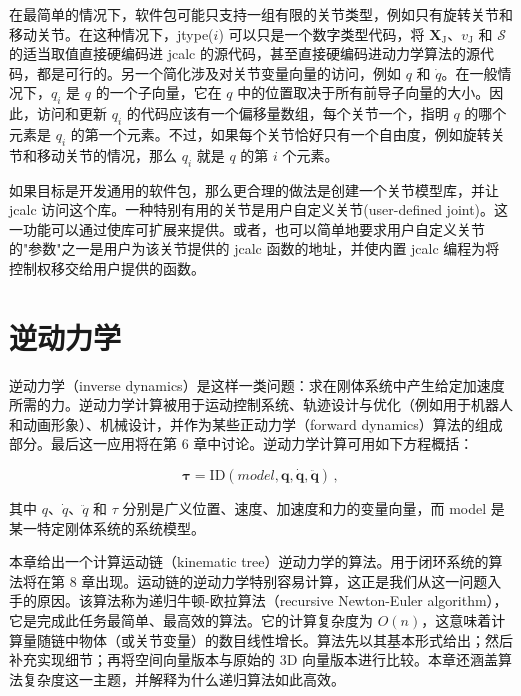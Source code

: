 \documentclass[10pt,a4paper]{book}
\theoremstyle{thmstyle} %
\theoremstyle{defstyle} %
\theoremstyle{prostyle} %
\begin{document}
在最简单的情况下，软件包可能只支持一组有限的关节类型，例如只有旋转关节和移动关节。在这种情况下，jtype($i$) 可以只是一个数字类型代码，将 $\mathbf{X}_{\mathrm{J}}$、$v_{\mathrm{J}}$ 和 $\mathcal{S}$ 的适当取值直接硬编码进 jcalc 的源代码，甚至直接硬编码进动力学算法的源代码，都是可行的。另一个简化涉及对关节变量向量的访问，例如 $q$ 和 $\dot{q}$。在一般情况下，$q_{i}$ 是 $q$ 的一个子向量，它在 $q$ 中的位置取决于所有前导子向量的大小。因此，访问和更新 $q_{i}$ 的代码应该有一个偏移量数组，每个关节一个，指明 $q$ 的哪个元素是 $q_{i}$ 的第一个元素。不过，如果每个关节恰好只有一个自由度，例如旋转关节和移动关节的情况，那么 $q_{i}$ 就是 $q$ 的第 $i$ 个元素。



如果目标是开发通用的软件包，那么更合理的做法是创建一个关节模型库，并让 jcalc 访问这个库。一种特别有用的关节是用户自定义关节(user-defined joint)。这一功能可以通过使库可扩展来提供。或者，也可以简单地要求用户自定义关节的"参数"之一是用户为该关节提供的 jcalc 函数的地址，并使内置 jcalc 编程为将控制权移交给用户提供的函数。





\chapter{逆动力学}







逆动力学（inverse dynamics）是这样一类问题：求在刚体系统中产生给定加速度所需的力。逆动力学计算被用于运动控制系统、轨迹设计与优化（例如用于机器人和动画形象）、机械设计，并作为某些正动力学（forward dynamics）算法的组成部分。最后这一应用将在第 6 章中讨论。逆动力学计算可用如下方程概括：



$$
\boldsymbol{ \tau } = \mathrm { I D } ( m o d e l , \boldsymbol{ q } , \dot { \boldsymbol{ q } } , \ddot { \boldsymbol{ q } } ) \, ,
$$



其中 $q$、$\dot{q}$、$\ddot{q}$ 和 $\tau$ 分别是广义位置、速度、加速度和力的变量向量，而 model 是某一特定刚体系统的系统模型。



本章给出一个计算运动链（kinematic tree）逆动力学的算法。用于闭环系统的算法将在第 8 章出现。运动链的逆动力学特别容易计算，这正是我们从这一问题入手的原因。该算法称为递归牛顿-欧拉算法（recursive Newton-Euler algorithm），它是完成此任务最简单、最高效的算法。它的计算复杂度为 $O(n)$，这意味着计算量随链中物体（或关节变量）的数目线性增长。算法先以其基本形式给出；然后补充实现细节；再将空间向量版本与原始的 3D 向量版本进行比较。本章还涵盖算法复杂度这一主题，并解释为什么递归算法如此高效。
\end{document}
